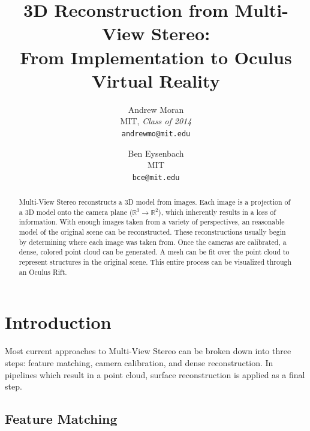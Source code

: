 \documentclass[10pt,twocolumn,letterpaper]{article}
\begin{document}
\title{3D Reconstruction from Multi-View Stereo:\\ From Implementation to Oculus Virtual Reality}

\author{Andrew Moran\\
  MIT, \textit{Class of 2014}\\
  {\tt\small andrewmo@mit.edu}
\and
Ben Eysenbach\\
MIT\\
{\tt\small bce@mit.edu}
}

\maketitle

\begin{abstract}
   Multi-View Stereo reconstructs a 3D model from images. Each image is a projection of a 3D model onto the camera plane ($\mathbb{R}^3 \rightarrow \mathbb{R}^2$), which inherently results in a loss of information. With enough images taken from a variety of perspectives, an reasonable model of the original scene can be reconstructed. These reconstructions usually begin by determining where each image was taken from. Once the cameras are calibrated, a dense, colored point cloud can be generated. A mesh can be fit over the point cloud to represent structures in the original scene. This entire process can be visualized through an Oculus Rift.
\end{abstract}

\section{Introduction}
Most current approaches to Multi-View Stereo can be broken down into three steps: feature matching, camera calibration, and dense reconstruction. In pipelines which result in a point cloud, surface reconstruction is applied as a final step.
\subsection{Feature Matching}
\end{document}
